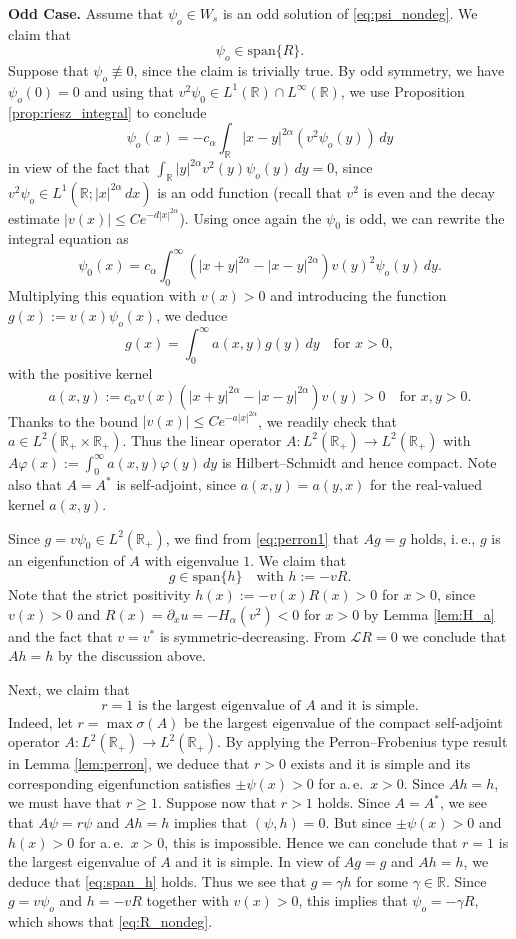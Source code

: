 \documentclass[reqno,10pt,a4paper]{amsart}
\theoremstyle{definition}
\theoremstyle{definition}
\theoremstyle{remark}
\theoremstyle{remark}
\numberwithin{equation}{section}
\newcommand{\R}{\mathbb{R}}
\newcommand{\pt}{\partial}
\newcommand{\be}{\begin{equation}}
\newcommand{\ee}{\end{equation}}
\renewcommand{\phi}{\varphi}
\newcommand{\LL}{\mathcal{L}}
\begin{document}
\medskip
\textbf{Odd Case.} Assume that $\psi_o \in W_s$ is an odd solution of \eqref{eq:psi_nondeg}. We claim that
\be \label{eq:R_nondeg}
\psi_o \in \mathrm{span} \{ R \}.
\ee
Suppose that $\psi_o \not \equiv 0$, since the claim is trivially true. By odd symmetry, we have $\psi_o(0)=0$ and using that $v^2 \psi_0 \in L^1(\R) \cap L^\infty(\R)$, we use Proposition \ref{prop:riesz_integral} to conclude
$$
\psi_o(x) = -c_\alpha \int_\R |x-y|^{2 \alpha}  (v^2 \psi_o(y)) \,dy 
$$ 
in view of the fact that $\int_{\R} |y|^{2 \alpha} v^2(y) \psi_o(y) \, dy = 0$, since $v^2 \psi_o \in L^1(\R; |x|^{2 \alpha} \, dx)$ is an odd function (recall that $v^2$ is even and the decay estimate $|v(x)| \leq C e^{-d|x|^{2 \alpha}}$). Using once again the $\psi_0$ is odd, we can rewrite the integral equation as
$$
\psi_0(x) = c_\alpha \int_0^\infty \left (|x+y|^{2 \alpha} - |x-y|^{2 \alpha} \right ) v(y)^2 \psi_o(y) \, dy.
$$
Multiplying this equation with $v(x) > 0$ and introducing the function $g(x) := v(x) \psi_o(x)$, we deduce
\be \label{eq:perron1}
g(x) = \int_0^\infty a(x,y) g(y) \, dy \quad \mbox{for $x > 0$},
\ee
with the positive kernel
$$
a(x,y) := c_\alpha v(x) \left (|x+y|^{2 \alpha} - |x-y|^{2 \alpha} \right ) v(y) > 0 \quad \mbox{for $x,y > 0$}.
$$
Thanks to the bound $|v(x)| \leq C e^{-a |x|^{2 \alpha}}$, we readily check that $a \in L^2(\R_{+} \times \R_{+})$. Thus the linear operator $A : L^2(\R_+) \to L^2(\R_+)$ with $A \phi(x) := \int_0^\infty a(x,y) \phi(y) \, dy$ is Hilbert--Schmidt and hence compact. Note also that $A=A^*$ is self-adjoint, since $a(x,y)=a(y,x)$ for the real-valued kernel $a(x,y)$. 

Since $g = v \psi_0 \in L^2(\R_+)$, we find from \eqref{eq:perron1} that $Ag = g$ holds, i.\,e., $g$ is an eigenfunction of $A$ with eigenvalue $1$. We claim that
\be \label{eq:span_h}
g \in \mathrm{span} \{ h \} \quad \mbox{with $h:=-v R$}.
\ee
Note that the strict positivity $h(x) := -v(x) R(x) > 0$ for $x >0$, since $v(x) > 0$ and $R(x)=\pt_x u=-H_\alpha(v^2) < 0$ for $x >0$ by Lemma \ref{lem:H_a} and the fact that $v=v^*$ is symmetric-decreasing. From $\LL R=0$ we conclude that $Ah = h$ by the discussion above.

Next, we claim that
\be
\mbox{$r=1$ is the largest eigenvalue of $A$ and it is simple}.
\ee
Indeed, let $r = \max \sigma(A)$ be the largest eigenvalue of the compact self-adjoint operator $A:L^2(\R_+) \to L^2(\R_+)$. By applying the Perron--Frobenius type result in Lemma \ref{lem:perron}, we deduce that $r >0$ exists and it is simple and its corresponding eigenfunction satisfies $\pm \psi(x) > 0$ for a.\,e.~$x > 0$. Since $Ah = h$, we must have that $r \geq 1$. Suppose now that $r > 1$ holds. Since $A=A^*$, we see that $A \psi = r \psi$ and $Ah = h$ implies that $(\psi, h) = 0$. But since $\pm \psi(x) > 0$ and $h(x) > 0$ for a.\,e.~$x>0$, this is impossible. Hence we can conclude that $r=1$ is the largest eigenvalue of $A$ and it is simple. In view of $Ag = g$ and $Ah = h$, we deduce  that \eqref{eq:span_h} holds. Thus we see that $g = \gamma h$ for some $\gamma \in \R$. Since $g= v \psi_o$ and $h=-v R$ together with $v(x) > 0$, this implies that $\psi_o = -\gamma R$, which shows that \eqref{eq:R_nondeg}. 
\end{document}
